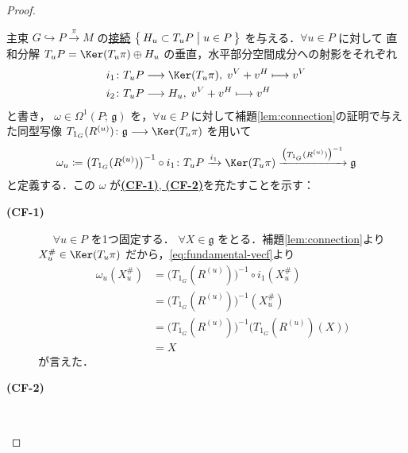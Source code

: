\documentclass[geometry_main]{subfiles}
\begin{document}
\begin{proof}
\begin{enumerate}
\begin{description}
            主束 $G \hookrightarrow P \xrightarrow{\pi} M$ の\hyperref[def:connection]{接続} $\bigl\{\, H_u \subset T_u P \bigm| u \in P \,\bigr\}$ を与える．$\forall u \in P$ に対して
            直和分解 $T_u P = \Ker (T_u \pi) \oplus H_u$ の垂直，水平部分空間成分への射影をそれぞれ 
            \begin{align}
                i_1 \colon T_u P &\lto \Ker (T_u \pi),\; v^V + v^H \lmto v^V \\
                i_2 \colon T_u P &\lto H_u,\; v^V + v^H \lmto v^H
            \end{align}
            と書き，
            $\omega \in \Omega^1(P;\, \mathfrak{g})$ を，$\forall u \in P$ に対して補題\ref{lem:connection}の証明で与えた同型写像 $T_{1_G} (R^{(u)}) \colon \mathfrak{g} \lto \Ker (T_u \pi)$ を用いて
            \begin{align}
                \omega_u \coloneqq \bigl(T_{1_G} (R^{(u)})\bigr)^{-1} \circ i_1 \colon T_u P \xrightarrow{i_1} \Ker (T_u \pi) \xrightarrow{\bigl(T_{1_G} (R^{(u)})\bigr)^{-1}} \mathfrak{g}
            \end{align}
            と定義する．この $\omega$ が\hyperref[def:connection]{\textbf{\textsf{(CF-1)}}, \textbf{\textsf{(CF-2)}}}を充たすことを示す：
            \begin{description}
                \item[\textbf{(CF-1)}]　
                $\forall u \in P$ を1つ固定する．
                $\forall X \in \mathfrak{g}$ をとる．補題\ref{lem:connection}より $X_u^\# \in \Ker (T_u\pi)$ だから，\eqref{eq:fundamental-vecf}より
                \begin{align}
                    \omega_u (X^\#_u) &= \bigl(T_{1_G} (R^{(u)})\bigr)^{-1} \circ i_1(X^\#_u) \\
                    &= \bigl(T_{1_G} (R^{(u)})\bigr)^{-1} (X^\#_u) \\
                    &= \bigl(T_{1_G} (R^{(u)})\bigr)^{-1} \bigl( T_{1_G}(R^{(u)})(X) \bigr)  \\
                    &= X \label{eq:CF-1}
                \end{align}
                が言えた．
                \item[\textbf{(CF-2)}]　
                

\end{description}
\end{description}
\end{enumerate}
\end{proof}
\end{document}
